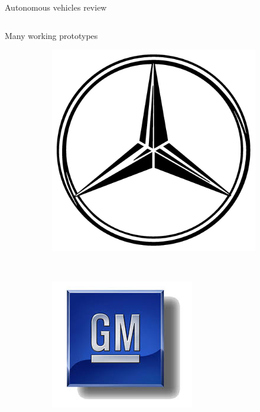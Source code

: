 \begin{frame}{Autonomous vehicles review}
\begin{columns}[T]
\begin{center}
\begin{overlayarea}{\textwidth}{\textheight}
{\begin{block}{Many working prototypes}
\begin{figure}[t]
\begin{subfigure}[b]{0.2\textwidth}
		\includegraphics[width=\textwidth]{mercedes_benz}
	      \end{subfigure}
	      ~
	      \begin{subfigure}[b]{0.2\textwidth}
		\includegraphics[width=\textwidth]{gm}
	      \end{subfigure}

\end{figure}
\end{block}}
\end{overlayarea}
\end{center}
\end{columns}
\end{frame}
